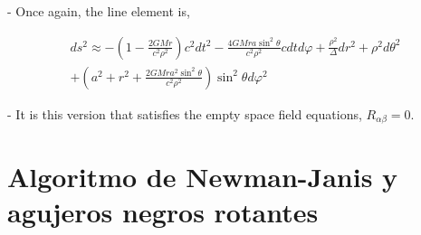 - Once again, the line element is,

$$
    \begin{array}{l}
        d s^2 \approx-\left(1-\frac{2 G M r}{c^2 \rho^2}\right) c^2 d t^2-\frac{4 G M r a \sin ^2 \theta}{c^2 \rho^2} c d t d \varphi+\frac{\rho^2}{\Delta} d r^2+\rho^2 d \theta^2 \\
        +\left(a^2+r^2+\frac{2 G M r a^2 \sin ^2 \theta}{c^2 \rho^2}\right) \sin ^2 \theta d \varphi^2
    \end{array}
$$

- It is this version that satisfies the empty space field equations, $R_{\alpha \beta}=0$.


\section{Algoritmo de Newman-Janis y agujeros negros rotantes}